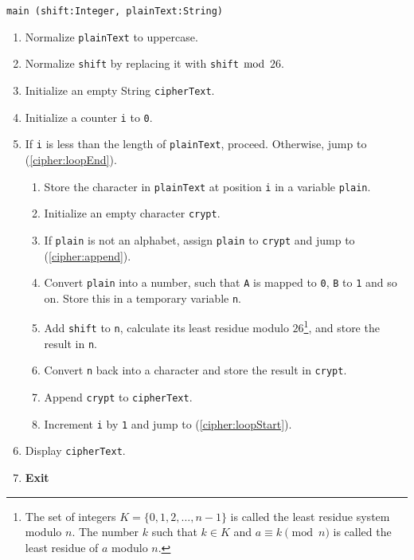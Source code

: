 \algorithm
{\tt main (shift:Integer, plainText:String)}
\begin{enumerate}
	\item	Normalize {\tt plainText} to uppercase.
	\item	Normalize {\tt shift} by replacing it with {\tt shift} $\bmod$ $26$.
	\item	Initialize an empty String {\tt cipherText}.
	\item	Initialize a counter {\tt i} to {\tt 0}.
	\item	If {\tt i} is less than the length of {\tt plainText}, proceed.
			Otherwise, jump to (\ref{cipher:loopEnd}). \label{cipher:loopStart}
	\begin{enumerate}
		\item	Store the character in {\tt plainText} at position {\tt i} in a variable {\tt plain}.
		\item	Initialize an empty character {\tt crypt}.
		\item	If {\tt plain} is not an alphabet, assign {\tt plain} to {\tt crypt} and jump to (\ref{cipher:append}).
		\item	Convert {\tt plain} into a number, such that {\tt A} is mapped to {\tt 0}, {\tt B} to {\tt 1} and so on.
				Store this in a temporary variable {\tt n}.
		\item	Add {\tt shift} to {\tt n}, calculate its least residue modulo $26$\footnote{The set of integers 
				$K = \{0, 1, 2, \dots , n-1\}$ is called the least residue system modulo $n$. The number $k$ such that 
				$k \in K$ and $a \equiv k \pmod{n}$ is called the least residue of $a$ modulo $n$.}, and store the result in {\tt n}.
		\item	Convert {\tt n} back into a character and store the result in {\tt crypt}.
		\item	Append {\tt crypt} to {\tt cipherText}.  \label{cipher:append}
		\item	Increment {\tt i} by {\tt 1} and jump to (\ref{cipher:loopStart}).
	\end{enumerate}
	\item	Display {\tt cipherText}.  \label{cipher:loopEnd}
	\item	{\bf Exit}
\end{enumerate}

\sourcecode
